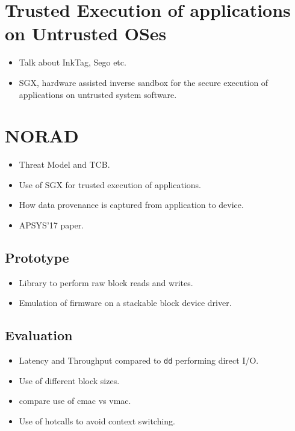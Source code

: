 \documentclass[withindex,glossary]{cam-thesis}
\begin{document}
\section{Trusted Execution of applications on Untrusted OSes}
\begin{itemize}
\item Talk about InkTag, Sego etc.
\item SGX, hardware assisted inverse sandbox for the secure execution of applications on untrusted system software.
\end{itemize}


\section{NORAD}
\begin{itemize}
\item Threat Model and TCB.
\item Use of SGX for trusted execution of applications.
\item How data provenance is captured from application to device.
\item APSYS'17 paper.
\end{itemize}

\subsection{Prototype}
\begin{itemize}
\item Library to perform raw block reads and writes.
\item Emulation of firmware on a stackable block device driver.
\end{itemize}

\subsection{Evaluation}
\begin{itemize}
\item Latency and Throughput compared to \texttt{dd} performing direct I/O.
\item Use of different block sizes.
\item compare use of cmac vs vmac.
\item Use of hotcalls to avoid context switching.
\end{itemize}
\end{document}

